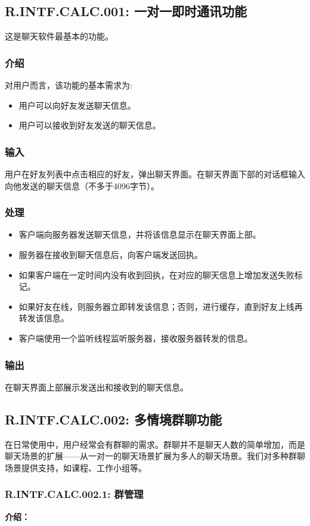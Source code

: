 \subsection{R.INTF.CALC.001: 一对一即时通讯功能}
这是聊天软件最基本的功能。
\subsubsection{介绍}
对用户而言，该功能的基本需求为:
\begin{itemize}
  \item 用户可以向好友发送聊天信息。
  \item 用户可以接收到好友发送的聊天信息。
\end{itemize}
\subsubsection{输入}
用户在好友列表中点击相应的好友，弹出聊天界面。在聊天界面下部的对话框输入向他发送的聊天信息（不多于4096字节）。
\subsubsection{处理}
\begin{itemize}
  \item 客户端向服务器发送聊天信息，并将该信息显示在聊天界面上部。
  \item 服务器在接收到聊天信息后，向客户端发送回执。
  \item 如果客户端在一定时间内没有收到回执，在对应的聊天信息上增加发送失败标记。
  \item 如果好友在线，则服务器立即转发该信息；否则，进行缓存，直到好友上线再转发该信息。
  \item 客户端使用一个监听线程监听服务器，接收服务器转发的信息。
\end{itemize}
\subsubsection{输出}
在聊天界面上部展示发送出和接收到的聊天信息。


\subsection{R.INTF.CALC.002: 多情境群聊功能}
在日常使用中，用户经常会有群聊的需求。群聊并不是聊天人数的简单增加，而是聊天场景的扩展——从一对一的聊天场景扩展为多人的聊天场景。我们对多种群聊场景提供支持，如课程、工作小组等。

\subsubsection{R.INTF.CALC.002.1: 群管理}
\textbf{介绍：}

